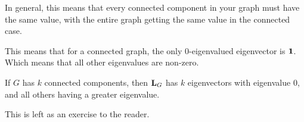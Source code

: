 \documentclass[11pt]{article}
\renewcommand\vec{\V}
\begin{document}
In general, this means that every connected component
in your graph must have the same value,
with the entire graph getting the same value in the connected case.

This means that for a connected graph,
the only $0$-eigenvalued eigenvector is $\vec{\V{1}}$.
Which means that all other eigenvalues are non-zero.

\begin{lemma}
If $G$ has $k$ connected components,
then $\V{L}_{G}$ has $k$ eigenvectors with eigenvalue $0$,
and all others having a greater eigenvalue.
\end{lemma}
This is left as an exercise to the reader.

\printbibliography
\end{document}
